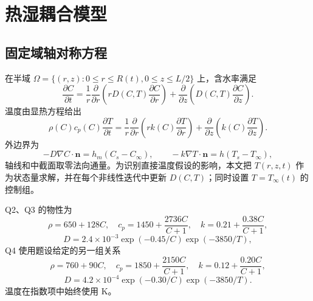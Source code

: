 \documentclass[withoutpreface,bwprint]{cumcmthesis}
\begin{document}
\section{热湿耦合模型}
\subsection{固定域轴对称方程}
在半域 $\Omega=\{(r,z):0\le r\le R(t),0\le z\le L/2\}$ 上，含水率满足
\begin{equation}
\frac{\partial C}{\partial t}=\frac1r\frac{\partial}{\partial r}\left(rD(C,T)\frac{\partial C}{\partial r}\right)+\frac{\partial}{\partial z}\left(D(C,T)\frac{\partial C}{\partial z}\right).
\label{eq:mass}
\end{equation}
温度由显热方程给出
\begin{equation}
\rho(C)c_p(C)\frac{\partial T}{\partial t}=\frac1r\frac{\partial}{\partial r}\left(rk(C)\frac{\partial T}{\partial r}\right)+\frac{\partial}{\partial z}\left(k(C)\frac{\partial T}{\partial z}\right).
\label{eq:heat}
\end{equation}
外边界为
\begin{equation}
-D\nabla C\cdot\boldsymbol n=h_m(C_s-C_\infty),\qquad -k\nabla T\cdot\boldsymbol n=h(T_s-T_\infty),
\label{eq:robin}
\end{equation}
轴线和中截面取零法向通量。为识别直接温度假设的影响，本文把 $T(r,z,t)$ 作为状态量求解，并在每个非线性迭代中更新 $D(C,T)$；同时设置 $T=T_\infty(t)$ 的控制组。

Q2、Q3 的物性为
\begin{equation}
\rho=650+128C,\quad c_p=1450+\frac{2736C}{C+1},\quad k=0.21+\frac{0.38C}{C+1},
\end{equation}
\begin{equation}
D=2.4\times10^{-3}\exp(-0.45/C)\exp(-3850/T),
\label{eq:q23}
\end{equation}
Q4 使用题设给定的另一组关系
\begin{equation}
\rho=760+90C,\quad c_p=1850+\frac{2150C}{C+1},\quad k=0.12+\frac{0.20C}{C+1},
\end{equation}
\begin{equation}
D=4.2\times10^{-4}\exp(-0.30/C)\exp(-3850/T).
\label{eq:q4}
\end{equation}
温度在指数项中始终使用 K。
\end{document}
